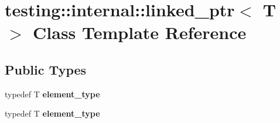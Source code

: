 \hypertarget{classtesting_1_1internal_1_1linked__ptr}{}\section{testing\+:\+:internal\+:\+:linked\+\_\+ptr$<$ T $>$ Class Template Reference}
\label{classtesting_1_1internal_1_1linked__ptr}
\subsection*{Public Types}
\begin{DoxyCompactItemize}
\item 
\hypertarget{classtesting_1_1internal_1_1linked__ptr_a295c7d1ee4100d916514c4e4385a0063}{}typedef T {\bfseries element\+\_\+type}\label{classtesting_1_1internal_1_1linked__ptr_a295c7d1ee4100d916514c4e4385a0063}

\item 
\hypertarget{classtesting_1_1internal_1_1linked__ptr_a295c7d1ee4100d916514c4e4385a0063}{}typedef T {\bfseries element\+\_\+type}\label{classtesting_1_1internal_1_1linked__ptr_a295c7d1ee4100d916514c4e4385a0063}

\end{DoxyCompactItemize}
